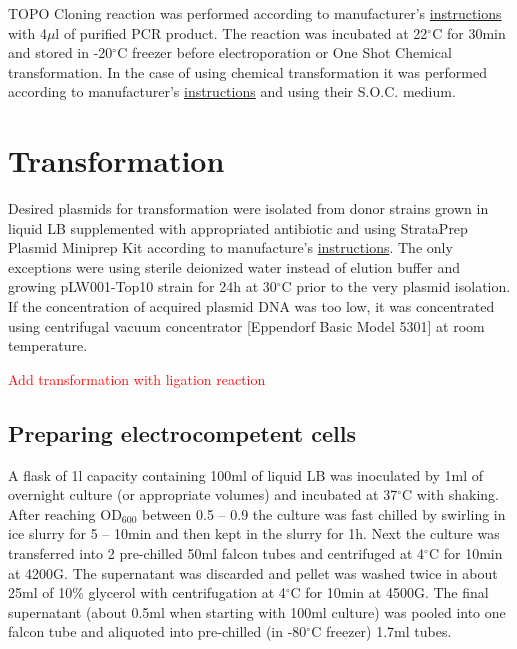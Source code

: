 TOPO\textsuperscript{\textregistered} Cloning reaction was performed according to manufacturer's \href{https://assets.thermofisher.com/TFS-Assets/LSG/manuals/pcr8gwtopo_man.pdf}{instructions} with 4$\mu$l of purified PCR product.
The reaction was incubated at 22$^{\circ}$C for 30min and stored in -20$^{\circ}$C freezer before electroporation or One Shot\textsuperscript{\textregistered} Chemical transformation.
In the case of using chemical transformation it was performed according to manufacturer's \href{https://assets.thermofisher.com/TFS-Assets/LSG/manuals/pcr8gwtopo_man.pdf}{instructions} and using their S.O.C. medium.

\section{Transformation}
Desired plasmids for transformation were isolated from donor strains grown in liquid LB supplemented with appropriated antibiotic and using StrataPrep Plasmid Miniprep Kit according to manufacture's \href{https://www.agilent.com/cs/library/usermanuals/public/400766.pdf}{instructions}.
The only exceptions were using sterile deionized water instead of elution buffer and growing pLW001-Top10 strain for 24h at 30$^{\circ}$C prior to the very plasmid isolation.
If the concentration of acquired plasmid DNA was too low, it was concentrated using centrifugal vacuum concentrator [Eppendorf\textsuperscript{\textregistered} Basic Model 5301] at room temperature.

\textcolor{red}{Add transformation with ligation reaction}

\subsection{Preparing electrocompetent cells}
A flask of 1l capacity containing 100ml of liquid LB was inoculated by 1ml of overnight culture (or appropriate volumes) and incubated at 37$^{\circ}$C with shaking.
After reaching OD$_{600}$ between 0.5 -- 0.9 the culture was fast chilled by swirling in ice slurry for 5 -- 10min and then kept in the slurry for 1h.
Next the culture was transferred into 2 pre-chilled 50ml falcon tubes and centrifuged  at 4$^{\circ}$C for 10min at 4200G.
The supernatant was discarded and pellet was washed twice in about 25ml of 10\% glycerol with centrifugation at 4$^{\circ}$C for 10min at 4500G.
The final supernatant (about 0.5ml when starting with 100ml culture) was pooled into one falcon tube and aliquoted into pre-chilled (in -80$^{\circ}$C freezer) 1.7ml tubes.

